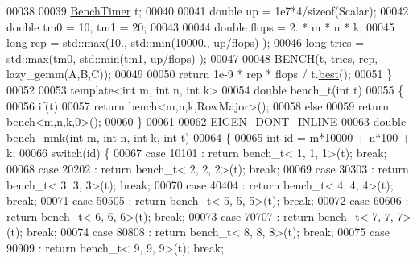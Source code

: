 \begin{DoxyCode}
00038 
00039   \hyperlink{class_eigen_1_1_bench_timer}{BenchTimer} t;
00040 
00041   \textcolor{keywordtype}{double} up = 1e7*4/\textcolor{keyword}{sizeof}(Scalar);
00042   \textcolor{keywordtype}{double} tm0 = 10, tm1 = 20;
00043 
00044   \textcolor{keywordtype}{double} flops = 2. * m * n * k;
00045   \textcolor{keywordtype}{long} rep = std::max(10., std::min(10000., up/flops) );
00046   \textcolor{keywordtype}{long} tries = std::max(tm0, std::min(tm1, up/flops) );
00047 
00048   BENCH(t, tries, rep, lazy\_gemm(A,B,C));
00049 
00050   \textcolor{keywordflow}{return} 1e-9 * rep * flops / t.\hyperlink{class_eigen_1_1_bench_timer_ae8b673b0fa356d3432c7a65c79e8af0e}{best}();
00051 \}
00052 
00053 \textcolor{keyword}{template}<\textcolor{keywordtype}{int} m, \textcolor{keywordtype}{int} n, \textcolor{keywordtype}{int} k>
00054 \textcolor{keywordtype}{double} bench\_t(\textcolor{keywordtype}{int} t)
00055 \{
00056   \textcolor{keywordflow}{if}(t)
00057     \textcolor{keywordflow}{return} bench<m,n,k,RowMajor>();
00058   \textcolor{keywordflow}{else}
00059     \textcolor{keywordflow}{return} bench<m,n,k,0>();
00060 \}
00061 
00062 EIGEN\_DONT\_INLINE
00063 \textcolor{keywordtype}{double} bench\_mnk(\textcolor{keywordtype}{int} m, \textcolor{keywordtype}{int} n, \textcolor{keywordtype}{int} k, \textcolor{keywordtype}{int} t)
00064 \{
00065   \textcolor{keywordtype}{int} \textcolor{keywordtype}{id} = m*10000 + n*100 + k;
00066   \textcolor{keywordflow}{switch}(\textcolor{keywordtype}{id}) \{
00067     \textcolor{keywordflow}{case}  10101 : \textcolor{keywordflow}{return} bench\_t< 1, 1, 1>(t); \textcolor{keywordflow}{break};
00068     \textcolor{keywordflow}{case}  20202 : \textcolor{keywordflow}{return} bench\_t< 2, 2, 2>(t); \textcolor{keywordflow}{break};
00069     \textcolor{keywordflow}{case}  30303 : \textcolor{keywordflow}{return} bench\_t< 3, 3, 3>(t); \textcolor{keywordflow}{break};
00070     \textcolor{keywordflow}{case}  40404 : \textcolor{keywordflow}{return} bench\_t< 4, 4, 4>(t); \textcolor{keywordflow}{break};
00071     \textcolor{keywordflow}{case}  50505 : \textcolor{keywordflow}{return} bench\_t< 5, 5, 5>(t); \textcolor{keywordflow}{break};
00072     \textcolor{keywordflow}{case}  60606 : \textcolor{keywordflow}{return} bench\_t< 6, 6, 6>(t); \textcolor{keywordflow}{break};
00073     \textcolor{keywordflow}{case}  70707 : \textcolor{keywordflow}{return} bench\_t< 7, 7, 7>(t); \textcolor{keywordflow}{break};
00074     \textcolor{keywordflow}{case}  80808 : \textcolor{keywordflow}{return} bench\_t< 8, 8, 8>(t); \textcolor{keywordflow}{break};
00075     \textcolor{keywordflow}{case}  90909 : \textcolor{keywordflow}{return} bench\_t< 9, 9, 9>(t); \textcolor{keywordflow}{break};

\end{DoxyCode}
